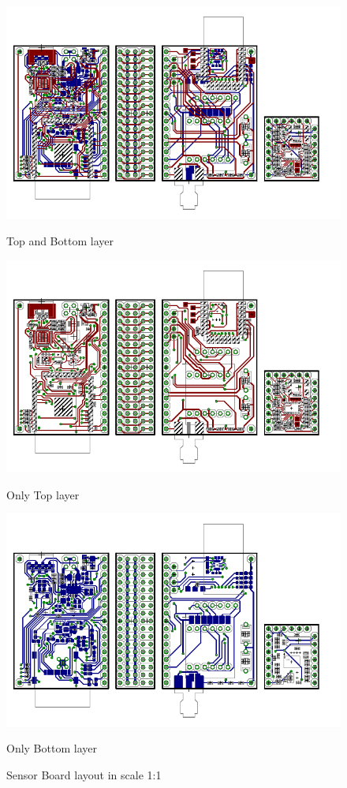 \begin{figure}
	\centering
	\includegraphics[scale=1]{img/brd.pdf}
	\vspace{-0.5cm}
	\begin{center}
		Top and Bottom layer
	\end{center}
	\includegraphics[scale=1]{img/brdTop.pdf}
	\vspace{-0.5cm}
	\begin{center}
		Only Top layer
	\end{center}
	\includegraphics[scale=1]{img/brdBottom.pdf}
	\vspace{-0.5cm}
	\begin{center}
		Only Bottom layer
	\end{center}
	\label{brd1}
	\caption{Sensor Board layout in scale 1:1}
\end{figure}

